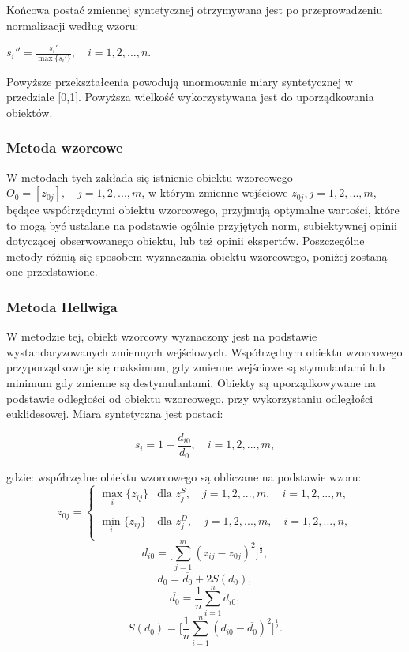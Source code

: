 \documentclass[12pt,a4paper]{report}
\begin{document}
Końcowa postać zmiennej syntetycznej otrzymywana jest po przeprowadzeniu normalizacji według wzoru:
\begin{center}
$s_{i}''=\frac{s_{i}'}{\max\{s_{i}'\}},\quad i=1, 2, ..., n$.\\
\end{center}
Powyższe przekształcenia powodują unormowanie miary syntetycznej w przedziale [0,1]. Powyższa wielkość wykorzystywana jest do uporządkowania obiektów.
\newpage

\subsubsection{Metoda wzorcowe}
\noindent

W metodach tych zakłada się istnienie obiektu wzorcowego $O_{0}=[z_{0j}], \quad  j= 1,2,...,m$, w którym zmienne wejściowe $z_{0j},  j= 1,2,...,m$, będące współrzędnymi obiektu wzorcowego, przyjmują optymalne wartości, które to mogą być ustalane na podstawie ogólnie przyjętych norm, subiektywnej opinii dotyczącej obserwowanego obiektu, lub też opinii ekspertów. Poszczególne metody różnią się sposobem wyznaczania obiektu wzorcowego, poniżej zostaną one przedstawione.

\subsubsection{Metoda Hellwiga}
\noindent

W metodzie tej, obiekt wzorcowy wyznaczony jest na podstawie wystandaryzowanych zmiennych wejściowych. Współrzędnym obiektu wzorcowego przyporządkowuje się maksimum, gdy zmienne wejściowe są stymulantami lub minimum gdy zmienne są destymulantami. Obiekty są uporządkowywane na podstawie odległości od obiektu wzorcowego, przy wykorzystaniu odległości euklidesowej.
Miara syntetyczna jest postaci: 
\begin{center}
$$s_i=1-\frac{d_{i0}}{d_{0}},\quad i=1, 2, ..., m ,$$
\end{center}
gdzie:
\newline
współrzędne obiektu wzorcowego są obliczane na podstawie wzoru:
$$z_{0j}=\left\{ \begin{array}{ll}
\max\limits_{i} \{z_{ij}\} & \textrm{dla  } z_{j}^S,\quad j=1,2,...,m, \quad i=1,2,...,n,\\\\
\min\limits_{i} \{z_{ij}\} & \textrm{dla } z_{j}^D, \quad j=1,2,...,m, \quad i=1,2,...,n,\\
\end{array} \right. $$
$$d_{i0}=\bigg[\sum_{j=1}^{m} (z_{ij} - z_{0j})^2 \bigg]^\frac{1}{2} ,$$ 
$$d_{0}=\overline{d_{0}} + 2S(d_{0}) ,$$
$$\overline{d_{0}}=\frac{1}{n}\sum_{i=1}^{n} d_{i0} ,$$
$$S(d_{0})=\bigg[\frac{1}{n}\sum_{i=1}^{n} (d_{i0}-\overline{d_{0}})^2 \bigg]^\frac{1}{2} .$$
\end{document}
